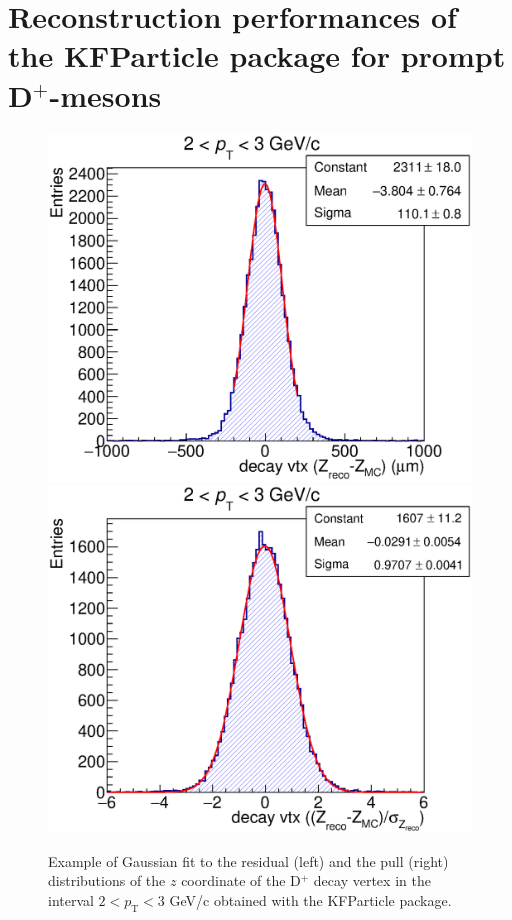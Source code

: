 \documentclass[b5paper,10pt,twoside,oldstyle,classica]{toptesi}
\newcommand{\pt}{p_\text{T}}
\begin{document}
\section{Reconstruction performances of the KFParticle package for prompt D$^+$-mesons}
\begin{figure}[b]
\begin{center}
{\includegraphics[scale = 0.28]{ResExKF.eps}}
\hspace{0.cm}
{\includegraphics[scale = 0.28]{PullExKF.eps}}
\caption{Example of Gaussian fit to the residual (left) and the pull (right) distributions of the $z$ coordinate of the D$^+$ decay vertex in the interval $2<\pt <3$ GeV/c obtained with the KFParticle package.}
\label{KF_respull}
\end{center}
\end{figure} 
\end{document}
